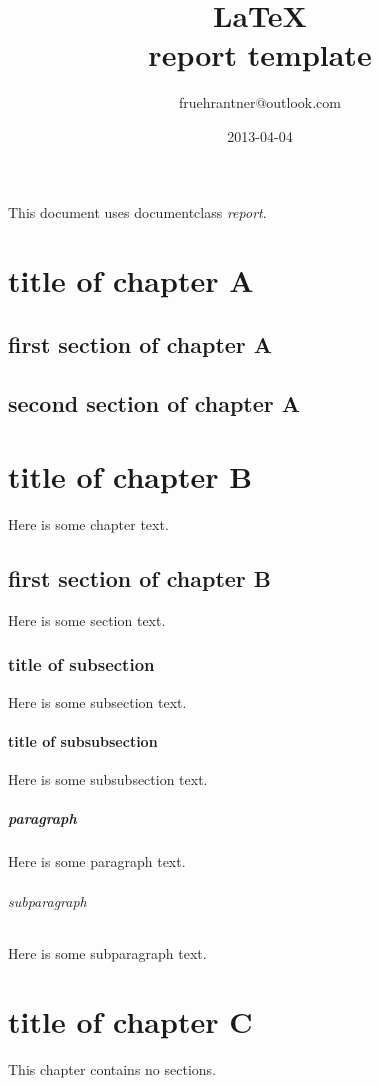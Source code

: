 \documentclass{report}
\begin{document}
\title{\LaTeX\\report template}
\author{fruehrantner@outlook.com}
\date{2013-04-04}
\maketitle

This document uses documentclass \textit{report}.

\tableofcontents

\chapter{title of chapter A}
\section{first section of chapter A}
\section{second section of chapter A}

\chapter{title of chapter B}
Here is some chapter text.
\section{first section of chapter B}
Here is some section text.
\subsection{title of subsection}
Here is some subsection text.
\subsubsection{title of subsubsection}
Here is some subsubsection text.
\paragraph{paragraph}
Here is some paragraph text.
\subparagraph{subparagraph}
Here is some subparagraph text.

\chapter{title of chapter C}
This chapter contains no sections.
\end{document}
